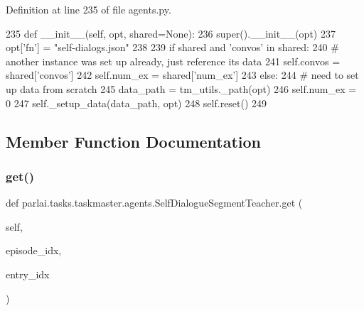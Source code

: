 Definition at line 235 of file agents.\+py.


\begin{DoxyCode}
235     \textcolor{keyword}{def }\_\_init\_\_(self, opt, shared=None):
236         super().\_\_init\_\_(opt)
237         opt[\textcolor{stringliteral}{'fn'}] = \textcolor{stringliteral}{"self-dialogs.json"}
238 
239         \textcolor{keywordflow}{if} shared \textcolor{keywordflow}{and} \textcolor{stringliteral}{'convos'} \textcolor{keywordflow}{in} shared:
240             \textcolor{comment}{# another instance was set up already, just reference its data}
241             self.convos = shared[\textcolor{stringliteral}{'convos'}]
242             self.num\_ex = shared[\textcolor{stringliteral}{'num\_ex'}]
243         \textcolor{keywordflow}{else}:
244             \textcolor{comment}{# need to set up data from scratch}
245             data\_path = tm\_utils.\_path(opt)
246             self.num\_ex = 0
247             self.\_setup\_data(data\_path, opt)
248         self.reset()
249 
\end{DoxyCode}


\subsection{Member Function Documentation}
\mbox{\label{classparlai_1_1tasks_1_1taskmaster_1_1agents_1_1SelfDialogueSegmentTeacher_a6c7dc5e3c5478b3769b28bd7f854a88b}} 
\subsubsection{\texorpdfstring{get()}{get()}}
{\footnotesize\ttfamily def parlai.\+tasks.\+taskmaster.\+agents.\+Self\+Dialogue\+Segment\+Teacher.\+get (\begin{DoxyParamCaption}\item[{}]{self,  }\item[{}]{episode\+\_\+idx,  }\item[{}]{entry\+\_\+idx }\end{DoxyParamCaption})}



